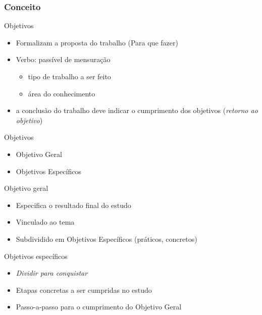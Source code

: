 \documentclass{beamer}
\begin{document}
\subsubsection{Conceito}

\begin{frame}{Objetivos}
  \begin{itemize}
    \footnotesize
  \item Formalizam a proposta do trabalho (\alert{Para que} fazer)
  \item \alert{Verbo}: passível de mensuração
    \begin{itemize}
      \scriptsize
    \item tipo de trabalho a ser feito
    \item área do conhecimento
    \end{itemize}
    \item a conclusão do trabalho deve indicar o cumprimento dos
      objetivos ({\em retorno ao objetivo})
  \end{itemize}
\end{frame}

\begin{frame}{Objetivos}
  \begin{itemize}
    \footnotesize
  \item Objetivo Geral
  \item Objetivos Específicos
  \end{itemize}
\end{frame}

\begin{frame}{Objetivo geral}
  \begin{itemize}
    \footnotesize
  \item Especifica o resultado final do estudo
  \item Vinculado ao tema
  \item Subdividido em Objetivos Específicos (práticos, concretos)
  \end{itemize}
\end{frame}

\begin{frame}{Objetivos específicos}
  \begin{itemize}
    \footnotesize
  \item {\em Dividir para conquistar}
  \item Etapas concretas a ser cumpridas no estudo
  \item Passo-a-passo para o cumprimento do Objetivo Geral
  \end{itemize}
\end{frame}
\end{document}

